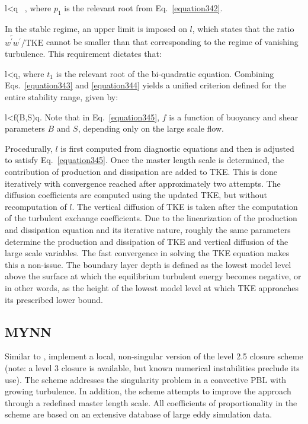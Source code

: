 \be
l<q \, , \label{equation343}
\ee
\noindent
 where $p_1$ is the relevant root from Eq.~\eqref{equation342}.

In the stable regime, an upper limit is imposed on $l$, which states that the ratio $\widetilde{w^{\prime}w^{\prime}}/\mathrm{TKE}$ cannot be smaller than that corresponding to the regime of vanishing turbulence. This requirement dictates that:

\be
l<q, \label{equation344}
\ee
\noindent
 where $t_1$ is the relevant root of the bi-quadratic equation. Combining Eqs.~\eqref{equation343} and \eqref{equation344} yields a unified criterion defined for the entire stability range, given by:

\be
l<f(B,S)q. \label{equation345}
\ee
\noindent
 Note that in Eq.~\eqref{equation345}, $f$ is a function of buoyancy and shear parameters $B$ and $S$, depending only on the large scale flow.

Procedurally, $l$ is first computed from diagnostic equations and then is adjusted to satisfy Eq.~\eqref{equation345}. Once the master length scale is determined, the contribution of production and dissipation are added to TKE. This is done iteratively with convergence reached after approximately two attempts. The diffusion coefficients are computed using the updated TKE, but without recomputation of $l$. The vertical diffusion of TKE is taken after the computation of the turbulent exchange coefficients. Due to the linearization of the production and dissipation equation and its iterative nature, roughly the same parameters determine the production and dissipation of TKE and vertical diffusion of the large scale variables. The fast convergence in solving the TKE equation makes this a non-issue. The boundary layer depth is defined as the lowest model level above the surface at which the equilibrium turbulent energy becomes negative, or in other words, as the height of the lowest model level at which TKE approaches its prescribed lower bound.

\subsection{MYNN}
\label{pbl-mynn-363}

Similar to  \citet{Jan02},  \citet{NN01, NN04, NN06} implement a local, non-singular version of the  \citet{MY82} level 2.5 closure scheme (note: a level 3 closure is available, but known numerical instabilities preclude its use). The scheme addresses the singularity problem in a convective PBL with growing turbulence. In addition, the scheme attempts to improve the  \citet{Jan02} approach through a redefined master length scale. All coefficients of proportionality in the scheme are based on an extensive database of large eddy simulation data.

